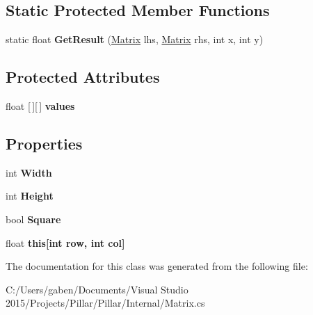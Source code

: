 \subsection*{Static Protected Member Functions}
\begin{DoxyCompactItemize}
\item 
\mbox{\label{class_pillar3_d_1_1_matrix_ab334d3ded7308b8369f10a8ac96995e8}} 
static float {\bfseries Get\+Result} (\hyperlink{class_pillar3_d_1_1_matrix}{Matrix} lhs, \hyperlink{class_pillar3_d_1_1_matrix}{Matrix} rhs, int x, int y)
\end{DoxyCompactItemize}
\subsection*{Protected Attributes}
\begin{DoxyCompactItemize}
\item 
\mbox{\label{class_pillar3_d_1_1_matrix_a00f82141d33fb84c859396554ba70eda}} 
float \mbox{[}$\,$\mbox{]}\mbox{[}$\,$\mbox{]} {\bfseries values}
\end{DoxyCompactItemize}
\subsection*{Properties}
\begin{DoxyCompactItemize}
\item 
\mbox{\label{class_pillar3_d_1_1_matrix_a28dc4fde57d531d6f11334e5431e5e56}} 
int {\bfseries Width}
\item 
\mbox{\label{class_pillar3_d_1_1_matrix_a2f92675194c0181b5a96ea3fa454a10e}} 
int {\bfseries Height}
\item 
\mbox{\label{class_pillar3_d_1_1_matrix_a1f525c0a15de27db30feca3170a15068}} 
bool {\bfseries Square}
\item 
\mbox{\label{class_pillar3_d_1_1_matrix_a6f45e28d4b1d6c79f9924c39c15a3e95}} 
float {\bfseries this\mbox{[}int row, int col\mbox{]}}
\end{DoxyCompactItemize}


The documentation for this class was generated from the following file\+:\begin{DoxyCompactItemize}
\item 
C\+:/\+Users/gaben/\+Documents/\+Visual Studio 2015/\+Projects/\+Pillar/\+Pillar/\+Internal/Matrix.\+cs\end{DoxyCompactItemize}
